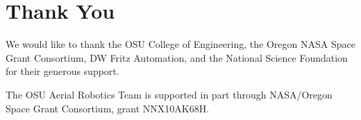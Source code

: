\documentclass[12pt,letterpaper]{article} \usepackage[margin=1in]{geometry}
\begin{document}
% 


\section*{Thank You}

We would like to thank the OSU College of Engineering, the Oregon NASA Space
Grant Consortium, DW Fritz Automation, and the National Science Foundation for
their generous support.

The OSU Aerial Robotics Team is supported in part through NASA/Oregon Space
Grant Consortium, grant NNX10AK68H.
\end{document}
